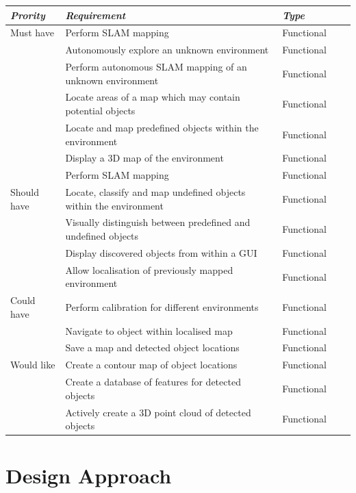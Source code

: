 \documentclass{mproj}
\begin{document}
\begin{tabular}{*5l}    \toprule
\emph{Prority} & \emph{Requirement} & \emph{Type} \\\midrule
\rowcolor{green!50} Must have & Perform SLAM mapping & Functional\\
\rowcolor{green!50} & Autonomously explore an unknown environment & Functional\\
\rowcolor{green!50} & Perform autonomous SLAM mapping of an unknown environment & Functional\\
\rowcolor{green!50} & Locate areas of a map which may contain potential objects & Functional\\
\rowcolor{green!50} & Locate and map predefined objects within the environment & Functional\\
\rowcolor{green!50} & Display a 3D map of the environment & Functional\\
\rowcolor{green!50} & Perform SLAM mapping & Functional\\
\rowcolor{yellow!50} Should have & Locate, classify and map undefined objects within the environment & Functional\\
\rowcolor{yellow!50} & Visually distinguish between predefined and undefined objects & Functional\\
\rowcolor{yellow!50} & Display discovered objects from within a GUI & Functional\\
\rowcolor{yellow!50} & Allow localisation of previously mapped environment  & Functional\\
\rowcolor{orange!50} Could have & Perform calibration for different environments  & Functional\\
\rowcolor{orange!50} & Navigate to object within localised map  & Functional\\
\rowcolor{orange!50} & Save a map and detected object locations  & Functional\\
\rowcolor{red!50} Would like & Create a contour map of object locations & Functional\\
\rowcolor{red!50} & Create a database of features for detected objects & Functional\\
\rowcolor{red!50} & Actively create a 3D point cloud of detected objects & Functional\\

\bottomrule
 \hline
\end{tabular}


\section{Design Approach}
\end{document}
